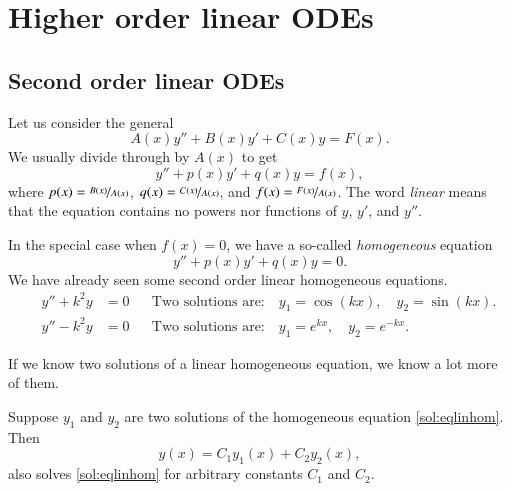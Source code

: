 \documentclass[12pt]{book}
\begin{document}
\chapter{Higher order linear ODEs} \label{ho:chapter}


\section{Second order linear ODEs}


Let us consider the general
\emph{}
\begin{equation*}
A(x) y'' + B(x)y' + C(x)y = F(x) .
\end{equation*}
We usually divide through by $A(x)$ to get
\begin{equation} \label{sol:eqlin}
y'' + p(x)y' + q(x)y = f(x) ,
\end{equation}
where $p(x) = \nicefrac{B(x)}{A(x)}$, $q(x) = \nicefrac{C(x)}{A(x)}$, and
$f(x) = \nicefrac{F(x)}{A(x)}$.
The word \emph{linear} means that the equation contains no powers nor
functions of $y$, $y'$, and $y''$.

In the special case when $f(x) = 0$, we have a so-called
\emph{homogeneous}
equation
\begin{equation} \label{sol:eqlinhom}
y'' + p(x)y' + q(x)y = 0 .
\end{equation}
We have already seen some second order linear homogeneous equations.
\begin{align*}
\qquad y'' + k^2 y & = 0 &
& \text{Two solutions are:} \quad y_1 = \cos (kx), \quad y_2 = \sin(kx) . \qquad \\
\qquad y'' - k^2 y & = 0 &
& \text{Two solutions are:} \quad y_1 = e^{kx}, \quad y_2 = e^{-kx} . \qquad
\end{align*}

If we know two solutions of a linear homogeneous equation, we know a lot
more of them.

\begin{theorem}[Superposition]
Suppose $y_1$ and $y_2$ are two solutions of the
homogeneous equation \eqref{sol:eqlinhom}.  Then 
\begin{equation*}
y(x) = C_1 y_1(x) + C_2 y_2(x) ,
\end{equation*}
also solves \eqref{sol:eqlinhom} for arbitrary constants $C_1$ and $C_2$.
\end{theorem}
\end{document}
